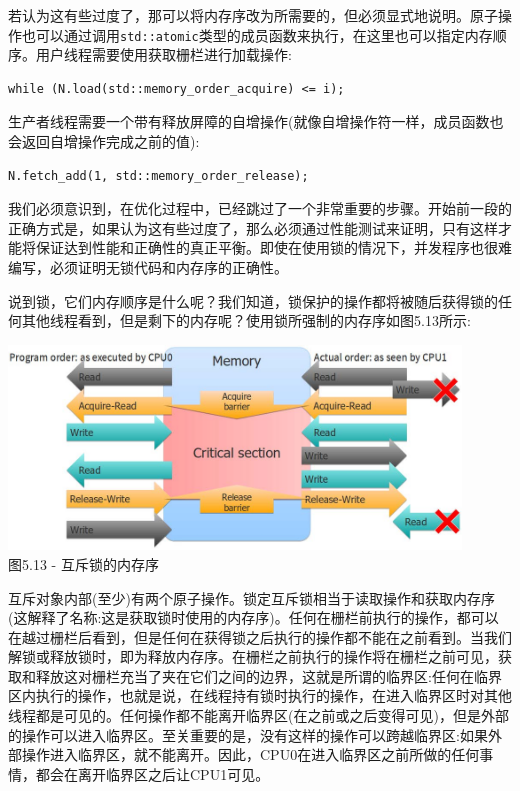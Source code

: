 若认为这有些过度了，那可以将内存序改为所需要的，但必须显式地说明。原子操作也可以通过调用\texttt{std::atomic}类型的成员函数来执行，在这里也可以指定内存顺序。用户线程需要使用获取栅栏进行加载操作:

\begin{lstlisting}[style=styleCXX]
while (N.load(std::memory_order_acquire) <= i);
\end{lstlisting}

生产者线程需要一个带有释放屏障的自增操作(就像自增操作符一样，成员函数也会返回自增操作完成之前的值):

\begin{lstlisting}[style=styleCXX]
N.fetch_add(1, std::memory_order_release);
\end{lstlisting}

我们必须意识到，在优化过程中，已经跳过了一个非常重要的步骤。开始前一段的正确方式是，如果认为这有些过度了，那么必须通过性能测试来证明，只有这样才能将保证达到性能和正确性的真正平衡。即使在使用锁的情况下，并发程序也很难编写，必须证明无锁代码和内存序的正确性。

说到锁，它们内存顺序是什么呢？我们知道，锁保护的操作都将被随后获得锁的任何其他线程看到，但是剩下的内存呢？使用锁所强制的内存序如图5.13所示:

\begin{center}
\includegraphics[width=0.9\textwidth]{content/1/chapter5/images/13.jpg}\\
图5.13 - 互斥锁的内存序
\end{center}

互斥对象内部(至少)有两个原子操作。锁定互斥锁相当于读取操作和获取内存序(这解释了名称:这是获取锁时使用的内存序)。任何在栅栏前执行的操作，都可以在越过栅栏后看到，但是任何在获得锁之后执行的操作都不能在之前看到。当我们解锁或释放锁时，即为释放内存序。在栅栏之前执行的操作将在栅栏之前可见，获取和释放这对栅栏充当了夹在它们之间的边界，这就是所谓的临界区:任何在临界区内执行的操作，也就是说，在线程持有锁时执行的操作，在进入临界区时对其他线程都是可见的。任何操作都不能离开临界区(在之前或之后变得可见)，但是外部的操作可以进入临界区。至关重要的是，没有这样的操作可以跨越临界区:如果外部操作进入临界区，就不能离开。因此，CPU0在进入临界区之前所做的任何事情，都会在离开临界区之后让CPU1可见。

